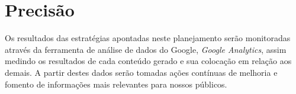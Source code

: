 \chapter{Precisão}

Os resultados das estratégias apontadas neste planejamento serão monitoradas através da ferramenta de análise de dados do Google, \emph{Google Analytics}, assim medindo os resultados de cada conteúdo gerado e sua colocação em relação aos demais. A partir destes dados serão tomadas ações contínuas de melhoria e fomento de informações mais relevantes para nossos públicos.
